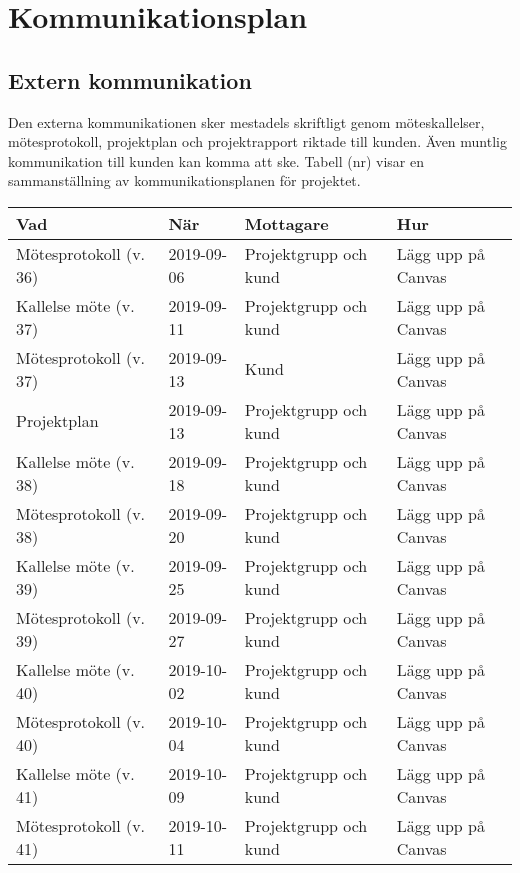 \documentclass[a4paper]{article}
\begin{document}
\section*{Kommunikationsplan}

\subsection*{Extern kommunikation}

Den externa kommunikationen sker mestadels skriftligt genom möteskallelser, mötesprotokoll, projektplan och projektrapport riktade till kunden. Även muntlig kommunikation till kunden kan komma att ske. Tabell (nr) visar en sammanställning av kommunikationsplanen för projektet.

\begin{table}[t]
\begin{tabular}{| l | l | l | l |}
\hline
\textbf{Vad}           & \textbf{När} & \textbf{Mottagare}    & \textbf{Hur}       \\ \hline
Mötesprotokoll (v. 36) & 2019-09-06   & Projektgrupp och kund & Lägg upp på Canvas \\ \hline
Kallelse möte  (v. 37) & 2019-09-11   & Projektgrupp och kund & Lägg upp på Canvas \\ \hline
Mötesprotokoll (v. 37) & 2019-09-13   & Kund                  & Lägg upp på Canvas \\ \hline
Projektplan            & 2019-09-13   & Projektgrupp och kund & Lägg upp på Canvas \\ \hline
Kallelse möte  (v. 38) & 2019-09-18   & Projektgrupp och kund & Lägg upp på Canvas \\ \hline
Mötesprotokoll (v. 38) & 2019-09-20   & Projektgrupp och kund & Lägg upp på Canvas \\ \hline
Kallelse möte  (v. 39) & 2019-09-25   & Projektgrupp och kund & Lägg upp på Canvas \\ \hline
Mötesprotokoll (v. 39) & 2019-09-27   & Projektgrupp och kund & Lägg upp på Canvas \\ \hline
Kallelse möte  (v. 40) & 2019-10-02   & Projektgrupp och kund & Lägg upp på Canvas \\ \hline
Mötesprotokoll (v. 40) & 2019-10-04   & Projektgrupp och kund & Lägg upp på Canvas \\ \hline
Kallelse möte  (v. 41) & 2019-10-09   & Projektgrupp och kund & Lägg upp på Canvas \\ \hline
Mötesprotokoll (v. 41) & 2019-10-11   & Projektgrupp och kund & Lägg upp på Canvas \\ \hline

\end{tabular}
\end{table}
\end{document}
